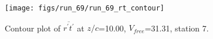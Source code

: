 \begin{figure}[H]
\centering
\texttt{[image: figs/run\_69/run\_69\_rt\_contour]}
\caption{Contour plot of $\overline{r^\prime t^\prime}$ at $z/c$=10.00, $V_{free}$=31.31, station 7.}
\label{fig:run_69_rt_contour}
\end{figure}


